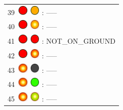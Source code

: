\documentclass[12pt, a4paper]{report}
\begin{document}
\begin{minipage}{0.45\textwidth}
\begin{Large}
\begin{tabular}{l}
		39\  \includegraphics*[width=5mm]{red_led} \includegraphics*[width=5mm]{orange_led} : -----\\
		
		40\  \includegraphics*[width=5mm]{red_led} \includegraphics*[width=5mm]{orange_led_flashing} : -----\\
		
		41\  \includegraphics*[width=5mm]{red_led} \includegraphics*[width=5mm]{red_led} : NOT\_ON\_GROUND\\
		
		42\  \includegraphics*[width=5mm]{red_led} \includegraphics*[width=5mm]{red_led_flashing} : -----\\
		
		43\  \includegraphics*[width=5mm]{red_led_flashing} \includegraphics*[width=5mm]{off_led} : -----\\
		
		44\  \includegraphics*[width=5mm]{red_led_flashing} \includegraphics*[width=5mm]{green_led} : -----\\
		
		45\  \includegraphics*[width=5mm]{red_led_flashing} \includegraphics*[width=5mm]{green_led_flashing} : -----\\
	

\end{tabular}
\end{Large}
\end{minipage}
\end{document}
